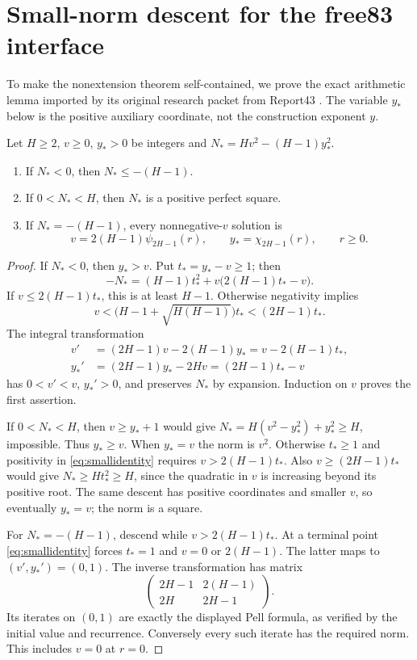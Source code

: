 \section{Small-norm descent for the free83 interface}
\label{sec:smallnorm}
To make the nonextension theorem self-contained, we prove the exact
arithmetic lemma imported by its original research packet from
Report43 \cite{smallnorm,freeaudit}. The variable $y_*$ below is the
positive auxiliary coordinate, not the construction exponent $y$.

\begin{lemma}
\label{lem:smallnorm}
Let $H\ge2$, $v\ge0$, $y_*>0$ be integers and
$N_*=Hv^2-(H-1)y_*^2$.
\begin{enumerate}
\item If $N_*<0$, then $N_*\le-(H-1)$.
\item If $0<N_*<H$, then $N_*$ is a positive perfect square.
\item If $N_*=-(H-1)$, every nonnegative-$v$ solution is
\[
 v=2(H-1)\psi_{2H-1}(r),\qquad y_*=\chi_{2H-1}(r),\qquad r\ge0.
\]
\end{enumerate}
\end{lemma}
\begin{proof}
If $N_*<0$, then $y_*>v$. Put $t_*=y_*-v\ge1$; then
\begin{equation}\label{eq:smallidentity}
 -N_*=(H-1)t_*^2+v\bigl(2(H-1)t_*-v\bigr).
\end{equation}
If $v\le2(H-1)t_*$, this is at least $H-1$. Otherwise negativity
implies
\[
 v<\bigl(H-1+\sqrt{H(H-1)}\bigr)t_*<(2H-1)t_*.
\]
The integral transformation
\begin{align*}
 v'&=(2H-1)v-2(H-1)y_*=v-2(H-1)t_*,\\
 y_*'&=(2H-1)y_*-2Hv=(2H-1)t_*-v
\end{align*}
has $0<v'<v$, $y_*'>0$, and preserves $N_*$ by expansion.
Induction on $v$ proves the first assertion.

If $0<N_*<H$, then $v\ge y_*+1$ would give
$N_*=H(v^2-y_*^2)+y_*^2\ge H$, impossible. Thus $y_*\ge v$.
When $y_*=v$ the norm is $v^2$. Otherwise $t_*\ge1$ and
positivity in \eqref{eq:smallidentity} requires
$v>2(H-1)t_*$. Also $v\ge(2H-1)t_*$ would give
$N_*\ge Ht_*^2\ge H$, since the quadratic in $v$ is increasing
beyond its positive root. The same descent has positive coordinates
and smaller $v$, so eventually $y_*=v$; the norm is a square.

For $N_*=-(H-1)$, descend while $v>2(H-1)t_*$.
At a terminal point \eqref{eq:smallidentity} forces $t_*=1$ and
$v=0$ or $2(H-1)$. The latter maps to $(v',y_*')=(0,1)$.
The inverse transformation has matrix
\[
 \begin{pmatrix}2H-1&2(H-1)\\2H&2H-1\end{pmatrix}.
\]
Its iterates on $(0,1)$ are exactly the displayed Pell formula,
as verified by the initial value and recurrence. Conversely every such
iterate has the required norm. This includes $v=0$ at $r=0$.
\end{proof}

